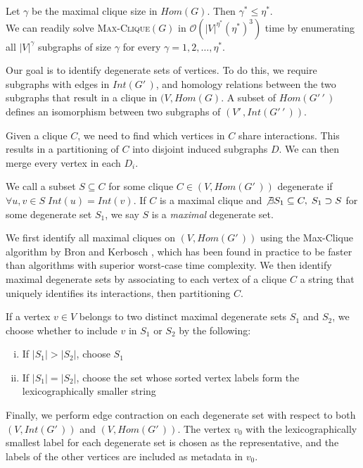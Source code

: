 \documentclass[12pt,twoside]{article}
\def\NI{\noindent}
\begin{document}
\NI Let $\gamma$ be the maximal clique size in $Hom(G)$. Then $\gamma^* \leq \eta^*$.\\
\NI We can readily solve \textsc{Max-Clique}$(G)$ in $\mathcal O(|V|^{\eta^*}(\eta^*)^3)$ time by enumerating all $|V|^{\gamma}$ subgraphs of size $\gamma$ for every $\gamma = 1, 2, \ldots, \eta^*$.

\NI Our goal is to identify degenerate sets of vertices. To do this, we require subgraphs with edges in $Int(G'\,\!)$, and homology relations between the two subgraphs that result in a clique in $(V,Hom(G)$. A subset of $Hom(G'\,\!'\,\!)$ defines an isomorphism between two subgraphs of $(V'\,\!, Int(G'\,\!'\,\!))$.

\NI Given a clique $C$, we need to find which vertices in $C$ share interactions. This results in a partitioning of $C$ into disjoint induced subgraphs $D$. We can then merge every vertex in each $D_i$.

\NI We call a subset $S \subseteq C$ for some clique $C \in (V,Hom(G'\,\!))$ degenerate if $\forall u,v \in S \; Int(u) = Int(v)$. If $C$ is a maximal clique and $\not \exists S_1 \subseteq C, \; S_1 \supset S$ for some degenerate set $S_1$, we say $S$ is a \emph{maximal} degenerate set.

\NI We first identify all maximal cliques on $(V,Hom(G'\,\!))$ using the {Max-Clique} algorithm by Bron and Kerbosch \cite{bron}, which has been found in practice to be faster than algorithms with superior worst-case time complexity. We then identify maximal degenerate sets by associating to each vertex of a clique $C$ a string that uniquely identifies its interactions, then partitioning $C$.

\NI If a vertex $v \in V$ belongs to two distinct maximal degenerate sets $S_1$ and $S_2$, we choose whether to include $v$ in $S_1$ or $S_2$ by the following:
\begin{enumerate}[i)]
\item If $|S_1| > |S_2|$, choose $S_1$
\item If $|S_1| = |S_2|$, choose the set whose sorted vertex labels form the lexicographically smaller string
\end{enumerate}

\NI Finally, we perform edge contraction on each degenerate set with respect to both $(V,Int(G'\,\!))$ and $(V,Hom(G'\,\!))$. The vertex $v_0$ with the lexicographically smallest label for each degenerate set is chosen as the representative, and the labels of the other vertices are included as metadata in $v_0$.
\end{document}
